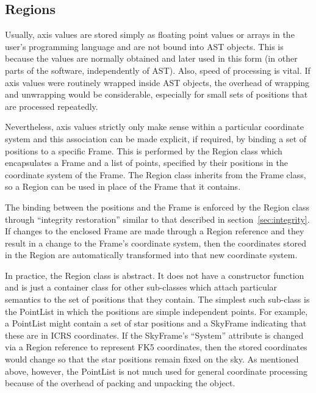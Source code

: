 \documentclass[final,authoryear,5p,times,twocolumn]{elsarticle}
\begin{document}
\subsection{Regions}
\label{sec:region}
Usually, axis values are stored simply as floating point values or arrays
in the user's programming language and are not bound into AST objects.
This is because the values are normally obtained and later used in this
form (in other parts of the software, independently of AST). Also, speed
of processing is vital. If axis values were routinely wrapped inside AST
objects, the overhead of wrapping and unwrapping would be considerable,
especially for small sets of positions that are processed repeatedly.

Nevertheless, axis values strictly only make sense within a particular
coordinate system and this association can be made explicit, if required,
by binding a set of positions to a specific Frame. This is performed by
the Region class which encapsulates a Frame and a list of points,
specified by their positions in the coordinate system of the Frame. The
Region class inherits from the Frame class, so a Region can be used in
place of the Frame that it contains.

The binding between the positions and the Frame is enforced by the Region
class through ``integrity restoration'' similar to that described in
section~\ref{sec:integrity}. If changes to the enclosed Frame are made
through a Region reference and they result in a change to the Frame's
coordinate system, then the coordinates stored in the Region are
automatically transformed into that new coordinate system.

In practice, the Region class is abstract. It does not have a constructor
function and is just a container class for other sub-classes which attach
particular semantics to the set of positions that they contain. The
simplest such sub-class is the PointList in which the positions are
simple independent points. For example, a PointList might contain a set
of star positions and a SkyFrame indicating that these are in ICRS
coordinates. If the SkyFrame's ``System'' attribute is changed via a Region
reference to represent FK5 coordinates, then the stored coordinates would
change so that the star positions remain fixed on the sky. As mentioned
above, however, the PointList is not much used for general coordinate
processing because of the overhead of packing and unpacking the object.
\end{document}
